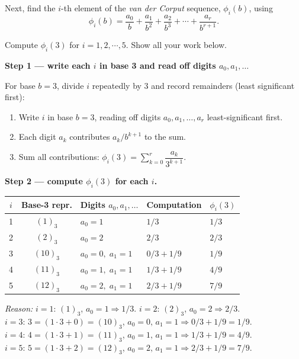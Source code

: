 \documentclass[10pt,a4paper]{article}
\newcommand{\reason}[1]{%
  \begin{mdframed}[backgroundcolor=reasonbg, linewidth=0.4pt,
    innertopmargin=3pt, innerbottommargin=3pt,
    innerleftmargin=6pt, innerrightmargin=6pt]
    \small\textit{Reason:} \small #1
  \end{mdframed}\vspace{2pt}}
\begin{document}
Next, find the $i$-th element of the \textit{van der Corput} sequence, $\phi_i(b)$, using
\[
  \phi_i(b) = \frac{a_0}{b} + \frac{a_1}{b^2} + \frac{a_2}{b^3} + \cdots + \frac{a_r}{b^{r+1}}.
\]

Compute $\phi_i(3)$ for $i=1,2,\cdots,5$. Show all your work below.

\medskip
\textbf{Step 1 --- write each $i$ in base 3 and read off digits $a_0, a_1, \ldots$}

For base $b=3$, divide $i$ repeatedly by 3 and record remainders (least significant first):

\begin{enumerate}[noitemsep]
  \item Write $i$ in base $b=3$, reading off digits $a_0, a_1, \ldots, a_r$ least-significant first.
  \item Each digit $a_k$ contributes $a_k/b^{k+1}$ to the sum.
  \item Sum all contributions: $\phi_i(3) = \displaystyle\sum_{k=0}^{r} \dfrac{a_k}{3^{k+1}}$.
\end{enumerate}

\medskip
\textbf{Step 2 --- compute $\phi_i(3)$ for each $i$.}

\vspace{4pt}
\begin{center}
\begin{tabular}{cclll}
\toprule
$i$ & Base-3 repr. & Digits $a_0, a_1, \ldots$ & Computation & $\phi_i(3)$ \\
\midrule
1 & $(1)_3$  & $a_0=1$           & $1/3$                 & $1/3$ \\
2 & $(2)_3$  & $a_0=2$           & $2/3$                 & $2/3$ \\
3 & $(10)_3$ & $a_0=0,\;a_1=1$   & $0/3+1/9$             & $1/9$ \\
4 & $(11)_3$ & $a_0=1,\;a_1=1$   & $1/3+1/9$             & $4/9$ \\
5 & $(12)_3$ & $a_0=2,\;a_1=1$   & $2/3+1/9$             & $7/9$ \\
\bottomrule
\end{tabular}
\end{center}

\reason{%
  $i=1$: $(1)_3$, $a_0=1 \Rightarrow 1/3$. \quad
  $i=2$: $(2)_3$, $a_0=2 \Rightarrow 2/3$.\\[2pt]
  $i=3$: $3=(1{\cdot}3+0)=(10)_3$, $a_0=0,\,a_1=1 \Rightarrow 0/3+1/9=1/9$.\\[2pt]
  $i=4$: $4=(1{\cdot}3+1)=(11)_3$, $a_0=1,\,a_1=1 \Rightarrow 1/3+1/9=4/9$.\\[2pt]
  $i=5$: $5=(1{\cdot}3+2)=(12)_3$, $a_0=2,\,a_1=1 \Rightarrow 2/3+1/9=7/9$.}
\end{document}
